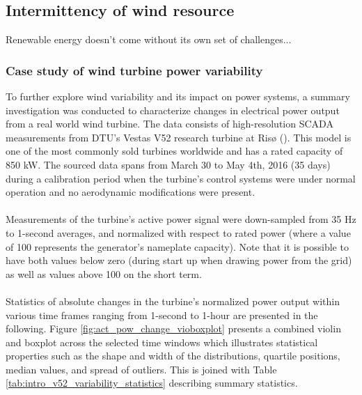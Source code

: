 \subsection{Intermittency of wind resource}
\label{sec:intro_intermittency}

Renewable energy doesn't come without its own set of challenges...




\clearpage
\subsubsection{Case study of wind turbine power  variability}
\label{sec:intro_intermittency_V52}

To further explore wind variability and its impact on power systems, a summary investigation was conducted to characterize changes in electrical power output from a real world wind turbine. The data consists of high-resolution SCADA measurements from DTU's Vestas V52 research turbine at Ris{\o} (\cite{dtu_v52}). This model is one of the most commonly sold turbines worldwide and has a rated capacity of 850 kW. The sourced data spans from March 30 to May 4th, 2016 (35 days) during a calibration period when the turbine's control systems were under normal operation and no aerodynamic modifications were present. 
\\\\
Measurements of the turbine's active power signal were down-sampled from 35 Hz to 1-second averages, and normalized with respect to rated power (where a value of 100 represents the generator's nameplate capacity). Note that it is possible to have both values below zero (during start up when drawing power from the grid) as well as values above 100 on the short term.
\\\\
Statistics of absolute changes in the turbine's normalized power output within various time frames ranging from 1-second to 1-hour are presented in the following. Figure \ref{fig:act_pow_change_vioboxplot} presents a combined violin and boxplot across the selected time windows which illustrates statistical properties such as the shape and width of the distributions, quartile positions, median values, and spread of outliers. This is joined with Table \ref{tab:intro_v52_variability_statistics} describing summary statistics.

